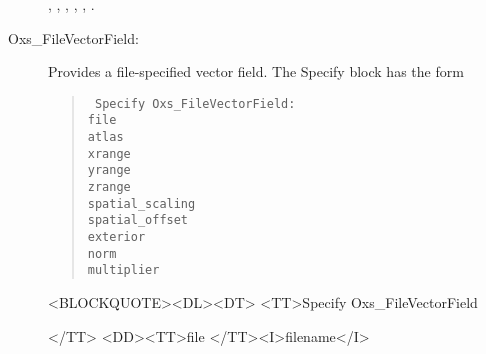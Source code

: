 \begin{description}
\begin{ExampleMifs}
  , ,
  , ,
  , .
\end{ExampleMifs}

\item[Oxs\_FileVectorField:\label{item:FileVectorField}]
%
   Provides a file-specified vector field.  The Specify block has the form
      \begin{latexonly}
      \begin{quote}\tt
      Specify Oxs\_FileVectorField: \ocb\\
       \bi file  \\
       \bi atlas \\
       \bi xrange \ocb{}\ccb\\
       \bi yrange \ocb{}\ccb\\
       \bi zrange \ocb{}\ccb\\
       \bi spatial\_scaling \ocb{}\ccb\\
       \bi spatial\_offset \ocb{}\ccb\\
       \bi exterior \\
       \bi norm  \\
       \bi multiplier \\
      \ccb
      \end{quote}
      \end{latexonly}
      \begin{rawhtml}
      <BLOCKQUOTE><DL><DT>
      <TT>Specify Oxs_FileVectorField {</TT>
      <DD><TT>file </TT><I>filename</I>

}
\end{rawhtml}
\end{description}
